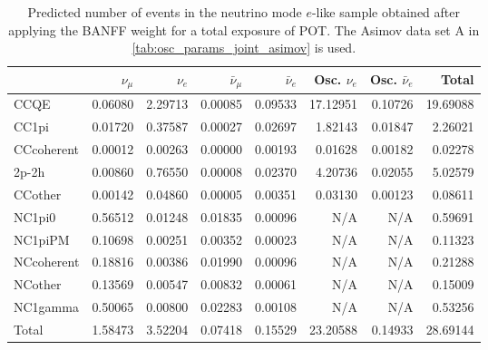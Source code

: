 
\begin{table}
\center
\begin{tabular} { | l ||r | r | r | r | r | r | | r | }
\hline
              & $\nu_\mu$            & $\nu_e$              & $\bar{\nu}_{\mu}$    & $\bar{\nu}_{e}$      & Osc. $\nu_e$         & Osc. $\bar{\nu}_{e}$ & Total                \\ \hline\hline
 CCQE         & 0.06080              & 2.29713              & 0.00085              & 0.09533              & 17.12951             & 0.10726              & 19.69088             \\ \hline
 CC1pi        & 0.01720              & 0.37587              & 0.00027              & 0.02697              & 1.82143              & 0.01847              & 2.26021              \\ \hline
 CCcoherent   & 0.00012              & 0.00263              & 0.00000              & 0.00193              & 0.01628              & 0.00182              & 0.02278              \\ \hline
 2p-2h        & 0.00860              & 0.76550              & 0.00008              & 0.02370              & 4.20736              & 0.02055              & 5.02579              \\ \hline
 CCother      & 0.00142              & 0.04860              & 0.00005              & 0.00351              & 0.03130              & 0.00123              & 0.08611              \\ \hline
 NC1pi0       & 0.56512              & 0.01248              & 0.01835              & 0.00096              & N/A                  & N/A                  & 0.59691              \\ \hline
 NC1piPM      & 0.10698              & 0.00251              & 0.00352              & 0.00023              & N/A                  & N/A                  & 0.11323              \\ \hline
 NCcoherent   & 0.18816              & 0.00386              & 0.01990              & 0.00096              & N/A                  & N/A                  & 0.21288              \\ \hline
 NCother      & 0.13569              & 0.00547              & 0.00832              & 0.00061              & N/A                  & N/A                  & 0.15009              \\ \hline
 NC1gamma     & 0.50065              & 0.00800              & 0.02283              & 0.00108              & N/A                  & N/A                  & 0.53256              \\ \hline
\hline
 Total        & 1.58473              & 3.52204              & 0.07418              & 0.15529              & 23.20588             & 0.14933              & 28.69144             \\ \hline

\end{tabular}
\caption{
Predicted number of events in the neutrino mode $e$-like sample
obtained after applying the BANFF weight
for a total exposure of \TotalPotNuRunOneSevenC{} POT.
The Asimov data set A in \cref{tab:osc_params_joint_asimov} is used.
}
\label{tab:events_1re_Asimov_A}
\end{table}


